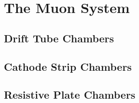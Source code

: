 \section{The Muon System}\label{sec:muon_sys}

\subsection{Drift Tube Chambers}\label{subsec:drift_tube}

\subsection{Cathode Strip Chambers}\label{subsec:csc}

\subsection{Resistive Plate Chambers}\label{subsec:rpc}